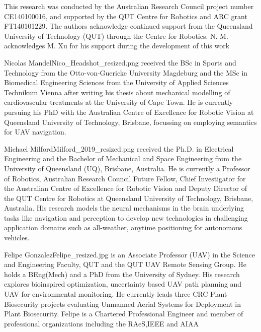 \documentclass[twocolumn,letterpaper]{IEEEAerospaceCLS}  %
\begin{document}
\acknowledgments
This research was conducted by the Australian Research Council project number CE140100016, and supported by the QUT Centre for Robotics and ARC grant FT140101229. The authors acknowledge continued support from the Queensland University of Technology (QUT) through the Centre for Robotics. N. M. acknowledges M. Xu for his support during the development of this work






\thebiography
\begin{biographywithpic}{Nicolas Mandel}{Nico_Headshot_resized.png}
    received the BSc in Sports and Technology from the Otto-von-Guericke University Magdeburg and the MSc in Biomedical Engineering Sciences from the University of Applied Sciences Technikum Vienna after writing his thesis about mechanical modelling of cardiovascular treatments at the University of Cape Town. He is currently pursuing his PhD with the Australian Centre of Excellence for Robotic Vision at Queensland University of Technology, Brisbane, focussing on employing semantics for UAV navigation.
\end{biographywithpic}

\begin{biographywithpic}{Michael Milford}{Milford_2019_resized.png}
    received the Ph.D. in Electrical Engineering and the Bachelor of Mechanical and Space Engineering from the University of Queensland (UQ), Brisbane, Australia. He is currently a Professor of Robotics, Australian Research Council Future Fellow, Chief Investigator for the Australian Centre of Excellence for Robotic Vision and Deputy Director of the QUT Centre for Robotics at Queensland University of Technology, Brisbane, Australia. His research models the neural mechanisms in the brain underlying tasks like navigation and perception to develop new technologies in challenging application domains such as all-weather, anytime positioning for autonomous vehicles.
\end{biographywithpic}

\begin{biographywithpic}{Felipe Gonzalez}{Felipe_resized.jpg}
    is an Associate Professor (UAV) in the Science and Engineering Faculty, QUT and the QUT UAV Remote Sensing Group.  He holds a BEng(Mech) and a PhD from the University of Sydney.  His research explores bioinspired  optimization,  uncertainty  based UAV path planning and UAV for environmental  monitoring.   He  currently  leads three  CRC  Plant  Biosecurity  projects evaluating  Unmanned  Aerial  Systems  for  Deployment  in Plant Biosecurity.  Felipe is a Chartered Professional Engineer and member of professional organizations including the RAeS,IEEE and AIAA
\end{biographywithpic}
\end{document}
